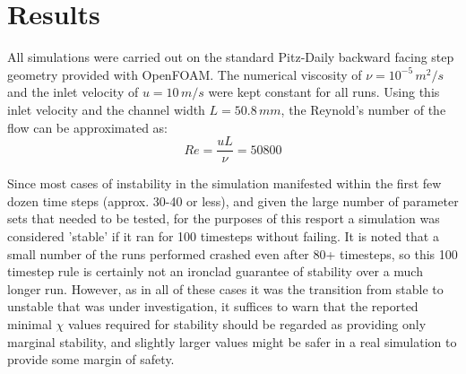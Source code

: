 \chapter{Results}


All simulations were carried out on the standard Pitz-Daily backward facing step geometry provided with OpenFOAM. The numerical viscosity of $\nu=10^{-5}\,m^2/s$ and the inlet velocity of $u=10\,m/s$ were kept constant for all runs. Using this inlet velocity and the channel width $L=50.8\,mm$, the Reynold's number of the flow can be approximated as: $$ Re=\frac{uL}{\nu}=50800$$

Since most cases of instability in the simulation manifested within the first few dozen time steps (approx. 30-40 or less), and given the large number of parameter sets that needed to be tested, for the purposes of this resport a simulation was considered 'stable' if it ran for 100 timesteps without failing. It is noted that a small number of the runs performed crashed even after 80+ timesteps, so this 100 timestep rule is certainly not an ironclad guarantee of stability over a much longer run. However, as in all of these cases it was the transition from stable to unstable that was under investigation, it suffices to warn that the reported minimal $\chi$ values required for stability should be regarded as providing only marginal stability, and slightly larger values might be safer in a real simulation to provide some margin of safety.